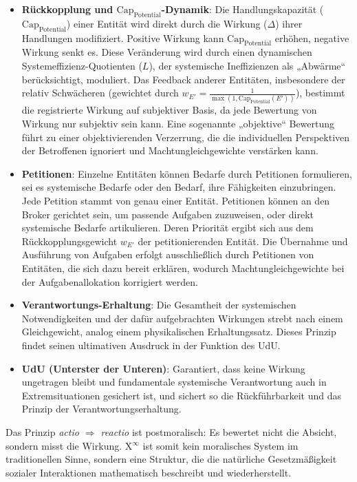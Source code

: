 \documentclass[12pt]{scrartcl}
\begin{document}
\begin{itemize}
    \item \textbf{Rückkopplung und $\text{Cap}_{\text{Potential}}$-Dynamik}: Die Handlungskapazität ($\text{Cap}_{\text{Potential}}$) einer Entität wird direkt durch die Wirkung ($\Delta$) ihrer Handlungen modifiziert. Positive Wirkung kann $\text{Cap}_{\text{Potential}}$ erhöhen, negative Wirkung senkt es. Diese Veränderung wird durch einen dynamischen Systemeffizienz-Quotienten ($L$), der systemische Ineffizienzen als „Abwärme“ berücksichtigt, moduliert. Das Feedback anderer Entitäten, insbesondere der relativ Schwächeren (gewichtet durch \( w_{E'} = \frac{1}{\max(1, \text{Cap}_{\text{Potential}}(E'))} \)), bestimmt die registrierte Wirkung auf subjektiver Basis, da jede Bewertung von Wirkung nur subjektiv sein kann. Eine sogenannte „objektive“ Bewertung führt zu einer objektivierenden Verzerrung, die die individuellen Perspektiven der Betroffenen ignoriert und Machtungleichgewichte verstärken kann.
    \item \textbf{Petitionen}: Einzelne Entitäten können Bedarfe durch Petitionen formulieren, sei es systemische Bedarfe oder den Bedarf, ihre Fähigkeiten einzubringen. Jede Petition stammt von genau einer Entität. Petitionen können an den Broker gerichtet sein, um passende Aufgaben zuzuweisen, oder direkt systemische Bedarfe artikulieren. Deren Priorität ergibt sich aus dem Rückkopplungsgewicht $w_{E'}$ der petitionierenden Entität. Die Übernahme und Ausführung von Aufgaben erfolgt ausschließlich durch Petitionen von Entitäten, die sich dazu bereit erklären, wodurch Machtungleichgewichte bei der Aufgabenallokation korrigiert werden.
    \item \textbf{Verantwortungs-Erhaltung}: Die Gesamtheit der systemischen Notwendigkeiten und der dafür aufgebrachten Wirkungen strebt nach einem Gleichgewicht, analog einem physikalischen Erhaltungssatz. Dieses Prinzip findet seinen ultimativen Ausdruck in der Funktion des UdU.
    \item \textbf{UdU (Unterster der Unteren)}: Garantiert, dass keine Wirkung ungetragen bleibt und fundamentale systemische Verantwortung auch in Extremsituationen gesichert ist, und sichert so die Rückführbarkeit und das Prinzip der Verantwortungserhaltung.
\end{itemize}

Das Prinzip \emph{actio $\Rightarrow$ reactio} ist postmoralisch: Es bewertet nicht die Absicht, sondern misst die Wirkung. X$^\infty$ ist somit kein moralisches System im traditionellen Sinne, sondern eine Struktur, die die natürliche Gesetzmäßigkeit sozialer Interaktionen mathematisch beschreibt und wiederherstellt.
\end{document}
